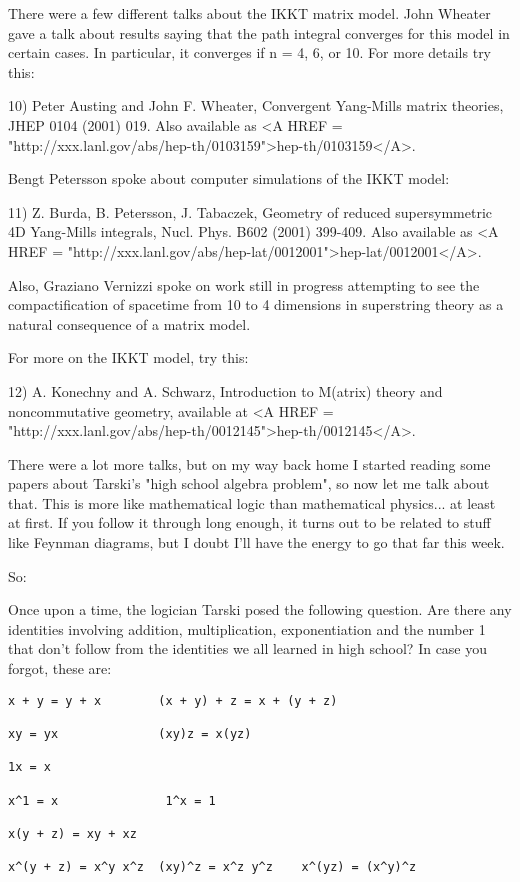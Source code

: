 There were a few different talks about the IKKT matrix model.  John
Wheater gave a talk about results saying that the path integral
converges for this model in certain cases.  In particular, it converges
if n = 4, 6, or 10.  For more details try this:

10) Peter Austing and John F. Wheater, Convergent Yang-Mills matrix
theories, JHEP 0104 (2001) 019.  Also available as <A HREF = "http://xxx.lanl.gov/abs/hep-th/0103159">hep-th/0103159</A>.

Bengt Petersson spoke about computer simulations of the IKKT model:

11) Z. Burda, B. Petersson, J. Tabaczek, Geometry of reduced
supersymmetric 4D Yang-Mills integrals, Nucl. Phys. B602 (2001) 399-409.
Also available as <A HREF = "http://xxx.lanl.gov/abs/hep-lat/0012001">hep-lat/0012001</A>.

Also, Graziano Vernizzi spoke on work still in progress attempting to
see the compactification of spacetime from 10 to 4 dimensions in
superstring theory as a natural consequence of a matrix model.

For more on the IKKT model, try this:

12) A. Konechny and A. Schwarz, Introduction to M(atrix) theory and
noncommutative geometry, available at <A HREF = "http://xxx.lanl.gov/abs/hep-th/0012145">hep-th/0012145</A>.

There were a lot more talks, but on my way back home I started
reading some papers about Tarski's "high school algebra problem",
so now let me talk about that.  This is more like mathematical logic
than mathematical physics... at least at first.  If you follow it
through long enough, it turns out to be related to stuff like Feynman
diagrams, but I doubt I'll have the energy to go that far this week.

So:

Once upon a time, the logician Tarski posed the following question.  Are
there any identities involving addition, multiplication, exponentiation
and the number 1 that don't follow from the identities we all learned in
high school?  In case you forgot, these are:

\begin{verbatim}
x + y = y + x        (x + y) + z = x + (y + z) 

xy = yx              (xy)z = x(yz)

1x = x

x^1 = x               1^x = 1

x(y + z) = xy + xz 

x^(y + z) = x^y x^z  (xy)^z = x^z y^z    x^(yz) = (x^y)^z
\end{verbatim}
    
